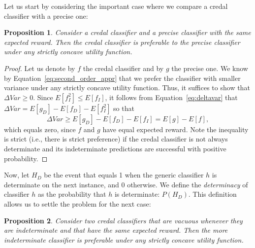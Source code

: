\documentclass[a4paper,10pt,reqno]{amsart}
\newtheorem{proposition}{Proposition}
\theoremstyle{remark}
\begin{document}
Let us start by considering the important case where we compare a credal classifier with a precise one:
\begin{proposition}
  Consider a credal classifier and a precise classifier with the same expected reward. Then the credal classifier is preferable to the precise classifier under any strictly concave utility function.
\end{proposition}

\begin{proof}
  Let us denote by $f$ the credal classifier and by $g$ the precise
  one. We know by Equation~\eqref{eq:second_order_appr} that we prefer the classifier with smaller variance under any strictly concave utility function. Thus, it suffices to show that $\Delta Var \geq
  0$. Since $E[f_I^2] \leq E[f_I]$, it follows from Equation~\eqref{eq:deltavar} that  $\Delta Var = E[g_D] - E[f_D] - E[f_I^2]$ so that\begin{equation*}
  \Delta Var \geq E[g_D] - E[f_D] - E[f_I] = E[g] - E[f], \end{equation*} which equals zero, since $f$ and $g$ have equal expected reward. Note the inequality is strict (i.e., there is strict preference) if the credal classifier is not always determinate and its indeterminate predictions are successful with positive probability.
  \end{proof}
 
Now, let $H_D$ be the event that equals 1 when the generic classifier $h$ is determinate on the next instance, and 0 otherwise. We define the \emph{determinacy} of classifier $h$ as the probability that $h$ is determinate: $P(H_D)$. This definition allows us to settle the problem for the next case:
\begin{proposition}
Consider two credal classifiers that are vacuous whenever
they are indeterminate and that have the same expected reward. Then the more indeterminate classifier is preferable under any
strictly concave utility function.
\end{proposition}
\end{document}
